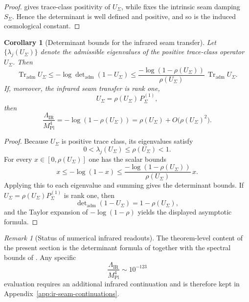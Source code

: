 \documentclass[11pt,a4paper]{article}
\newtheorem{corollary}[theorem]{Corollary}
\theoremstyle{definition}
\theoremstyle{remark}
\newtheorem*{remark}{Remark}
\DeclareMathOperator{\tr}{Tr}
\newcommand{\Mplunred}{M_{\mathrm{Pl}}}
\begin{document}
\begin{proof}
 gives trace-class positivity of
$U_\Sigma$, while  fixes the intrinsic seam damping $S_\Sigma$.
Hence the determinant is well defined and positive, and so is the induced cosmological constant.
\end{proof}

\begin{corollary}[Determinant bounds for the infrared seam transfer]
\label{cor:ir-seam-transfer-bounds}
Let $\{\lambda_j(U_\Sigma)\}$ denote the admissible eigenvalues of the positive trace-class
operator $U_\Sigma$. Then
\[
\tr_{\mathrm{adm}}U_\Sigma
\le
-\log\det\nolimits_{\mathrm{adm}}(1-U_\Sigma)
\le
\frac{-\log(1-\rho(U_\Sigma))}{\rho(U_\Sigma)}\,\tr_{\mathrm{adm}}U_\Sigma.
\]
If, moreover, the infrared seam transfer is rank one,
\[
U_\Sigma=\rho(U_\Sigma)\,P_\Sigma^{(1)},
\]
then
\[
\frac{\Lambda_{\mathrm{IR}}}{\Mplunred^4}
=
-\log(1-\rho(U_\Sigma))
=
\rho(U_\Sigma)+O\!\bigl(\rho(U_\Sigma)^2\bigr).
\]
\end{corollary}

\begin{proof}
Because $U_\Sigma$ is positive trace class, its eigenvalues satisfy
\[
0<\lambda_j(U_\Sigma)\le \rho(U_\Sigma)<1.
\]
For every $x\in[0,\rho(U_\Sigma)]$ one has the scalar bounds
\[
x\le -\log(1-x)\le \frac{-\log(1-\rho(U_\Sigma))}{\rho(U_\Sigma)}\,x.
\]
Applying this to each eigenvalue and summing gives the determinant bounds. If
$U_\Sigma=\rho(U_\Sigma)P_\Sigma^{(1)}$ is rank one, then
\[
\det\nolimits_{\mathrm{adm}}(1-U_\Sigma)=1-\rho(U_\Sigma),
\]
and the Taylor expansion of $-\log(1-\rho)$ yields the displayed asymptotic formula.
\end{proof}

\begin{remark}[Status of numerical infrared readouts]
The theorem-level content of the present section is the determinant formula of
 together with the spectral bounds of
. Any specific
\[
\frac{\Lambda_{\mathrm{IR}}}{\Mplunred^4}\sim 10^{-123}
\]
evaluation requires an additional infrared continuation and is therefore kept in
Appendix~\ref{app:ir-seam-continuations}.
\end{remark}
\end{document}
